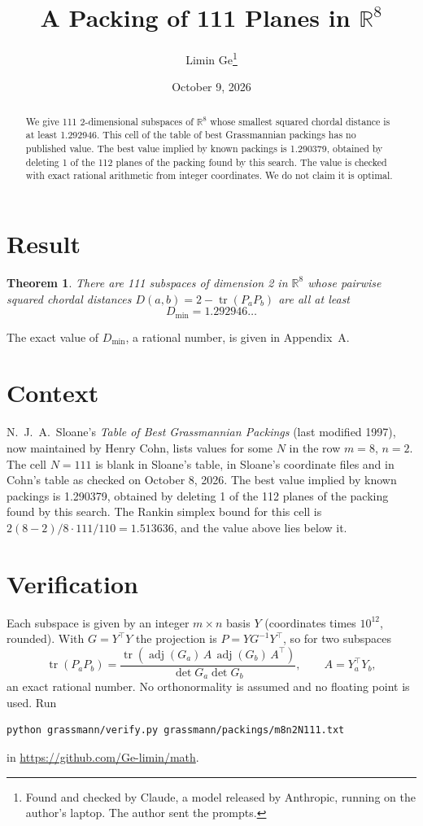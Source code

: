 \documentclass[11pt,a4paper]{article}
\title{A Packing of 111 Planes in $\mathbb{R}^{8}$}
\author{Limin Ge\thanks{Found and checked by Claude, a model released by Anthropic, running on the author's laptop. The author sent the prompts.}}
\date{October 9, 2026}
\newtheorem*{theorem}{Theorem}
\begin{document}
\maketitle
\begin{abstract}
We give 111 2-dimensional subspaces of $\mathbb{R}^{8}$ whose smallest squared chordal distance is at least 1.292946. This cell of the table of best Grassmannian packings has no published value. The best value implied by known packings is 1.290379, obtained by deleting 1 of the 112 planes of the packing found by this search. The value is checked with exact rational arithmetic from integer coordinates. We do not claim it is optimal.
\end{abstract}

\section{Result}
\begin{theorem}
There are 111 subspaces of dimension 2 in $\mathbb{R}^{8}$ whose pairwise squared chordal distances $D(a,b) = 2 - \operatorname{tr}(P_aP_b)$ are all at least
\[ D_{\min} = 1.292946\ldots \]
\end{theorem}
The exact value of $D_{\min}$, a rational number, is given in Appendix~A.


\section{Context}
N.~J.~A.~Sloane's \emph{Table of Best Grassmannian Packings} (last modified 1997), now maintained by Henry Cohn, lists values for some $N$ in the row $m=8$, $n=2$. The cell $N=111$ is blank in Sloane's table, in Sloane's coordinate files and in Cohn's table as checked on October 8, 2026. The best value implied by known packings is 1.290379, obtained by deleting 1 of the 112 planes of the packing found by this search. The Rankin simplex bound for this cell is $2(8-2)/8\cdot 111/110 = 1.513636$, and the value above lies below it.


\section{Verification}
Each subspace is given by an integer $m\times n$ basis $Y$ (coordinates times $10^{12}$, rounded). With $G=Y^\top Y$ the projection is $P=YG^{-1}Y^\top$, so for two subspaces
\[ \operatorname{tr}(P_aP_b)=\frac{\operatorname{tr}(\operatorname{adj}(G_a)\,A\,\operatorname{adj}(G_b)\,A^\top)}{\det G_a\det G_b},\qquad A=Y_a^\top Y_b, \]
an exact rational number. No orthonormality is assumed and no floating point is used. Run
\begin{verbatim}
python grassmann/verify.py grassmann/packings/m8n2N111.txt
\end{verbatim}
in \url{https://github.com/Ge-limin/math}.
\end{document}

